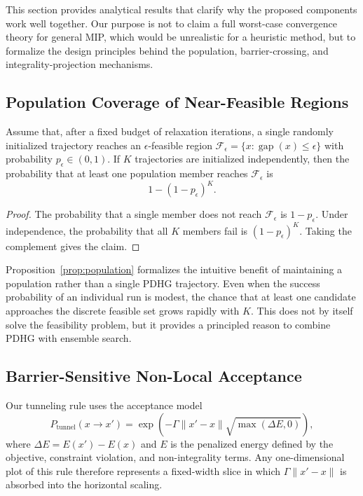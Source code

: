 This section provides analytical results that clarify why the proposed components work well together. Our purpose is not to claim a full worst-case convergence theory for general MIP, which would be unrealistic for a heuristic method, but to formalize the design principles behind the population, barrier-crossing, and integrality-projection mechanisms.

\subsection{Population Coverage of Near-Feasible Regions}

\begin{proposition}
\label{prop:population}
Assume that, after a fixed budget of relaxation iterations, a single randomly initialized trajectory reaches an $\epsilon$-feasible region $\mathcal{F}_\epsilon = \{x : \operatorname{gap}(x) \leq \epsilon\}$ with probability $p_\epsilon \in (0,1)$. If $K$ trajectories are initialized independently, then the probability that at least one population member reaches $\mathcal{F}_\epsilon$ is
\begin{equation}
    1 - (1 - p_\epsilon)^K.
\end{equation}
\end{proposition}

\begin{proof}
The probability that a single member does not reach $\mathcal{F}_\epsilon$ is $1-p_\epsilon$. Under independence, the probability that all $K$ members fail is $(1-p_\epsilon)^K$. Taking the complement gives the claim.
\end{proof}

Proposition~\ref{prop:population} formalizes the intuitive benefit of maintaining a population rather than a single PDHG trajectory. Even when the success probability of an individual run is modest, the chance that at least one candidate approaches the discrete feasible set grows rapidly with $K$. This does not by itself solve the feasibility problem, but it provides a principled reason to combine PDHG with ensemble search.

\subsection{Barrier-Sensitive Non-Local Acceptance}

Our tunneling rule uses the acceptance model
\begin{equation}
\label{eq:wkb-accept}
    P_{\mathrm{tunnel}}(x \to x') = \exp\left(-\Gamma \|x' - x\| \sqrt{\max(\Delta E, 0)}\right),
\end{equation}
where $\Delta E = E(x') - E(x)$ and $E$ is the penalized energy defined by the objective, constraint violation, and non-integrality terms. Any one-dimensional plot of this rule therefore represents a fixed-width slice in which $\Gamma\|x'-x\|$ is absorbed into the horizontal scaling.

